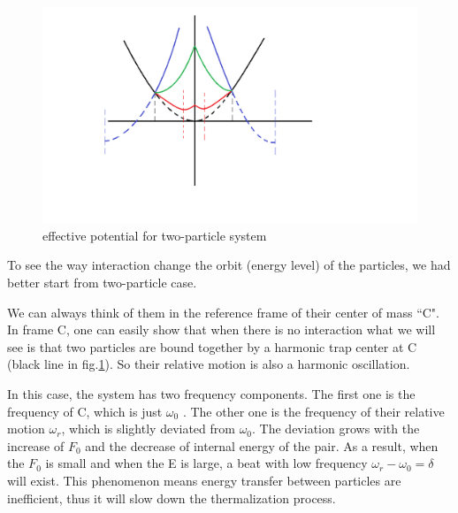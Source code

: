 \documentclass[aps,pre,twocolumn,groupedaddress]{revtex4-1}
\begin{document}
\begin{figure}[hbtp]
\centering
\includegraphics[scale=0.2]{ZhiyuPictures/effective_potential.png}
\caption{effective potential for two-particle system}
\label{fig:thermalization2}
\end{figure}

To see the way interaction change the orbit (energy level) of the particles, we had better start from two-particle case.

We can always think of them in the reference frame of their center of mass ``C". In frame C, one can easily show that when there is no interaction what we will see is that two particles are bound together by a harmonic trap center at C (black line in fig.\ref{fig:thermalization2}). So their relative motion is also a harmonic oscillation. 

In this case, the system has two frequency components. The first one is the frequency of C, which is just $\omega_0$ . The other one is the frequency of their relative motion $\omega_r$, which is slightly deviated from $\omega_0$. The deviation grows with the increase of $F_0$ and the decrease of internal energy of the pair. As a result, when the $F_0$ is small and when the E is large, a beat with low frequency $\omega_r-\omega_0=\delta$ will exist. This phenomenon means energy transfer between particles are inefficient, thus it will slow down the thermalization process. 
\end{document}
